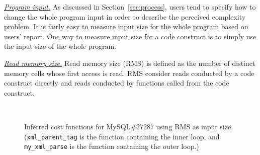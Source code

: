 \underline{\textit{Program input.}}
As discussed in Section~\ref{sec:process}, 
users tend to specify how to change the whole program 
input in order to describe the perceived complexity problem.
It is fairly easy to measure input size for the whole program based on users' report.
One way to measure input size for a code construct
is to simply use the input size of the whole program. 


\underline{\textit{Read memory size.}}
Read memory size (RMS) is defined as the number of distinct memory cells 
whose first access is read. 
RMS consider reads conducted by a code construct directly 
and reads conducted by 
functions called from the code construct. 


\begin{figure}
\centering
{}
 \\ 
\vspace{-0.1in}
\caption{Inferred cost functions for MySQL\#27287 using RMS as input size.
\footnotesize{(\texttt{xml\_parent\_tag} is the function containing the inner loop, 
and \texttt{my\_xml\_parse} is the function containing the outer loop.)}} 
\label{fig:mysql27287-2} 
\end{figure} 

